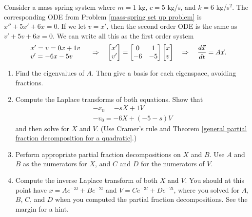 \begin{problem}\label{mass-spring system of first order ODEs solution introduction}
 Consider a mass spring system where $m=1$ kg, $c=5$ kg/s, and  $k=6$ kg/s$^2$.  The corresponding ODE from Problem \ref{mass-spring set up problem} is $x''+5x'+6x=0$. If we let $v=x'$, then the second order ODE is the same as $v'+5v+6x=0$. We can write all this as the first order system
$$
\begin{array}{l}
x'=v=0x+1v\\
v'=-6x-5v 
\end{array}
\quad\Rightarrow\quad
\begin{bmatrix} x'\\v' \end{bmatrix} =\begin{bmatrix} 0&1\\-6&-5 \end{bmatrix}\begin{bmatrix} x\\v \end{bmatrix} 
\quad\Rightarrow\quad
\dfrac{d\vec{x}}{dt} =A\vec x. 
$$
\begin{enumerate}
 \item Find the eigenvalues of $A$.  Then give a basis for each eigenspace, avoiding fractions.
 \item Compute the Laplace transforms of both equations.  
%
Show that
$$
\begin{array}{l}
 -x_0 = -sX+1V\\
 -v_0 = -6X+(-5-s)V
\end{array}
$$
and then solve for $X$ and $V$. (Use Cramer's rule and Theorem \ref{general partial fraction decomposition for a quadratic}.)
\item 
Perform appropriate partial fraction decompositions on $X$ and $B$. Use $A$ and $B$ as the numerators for $X$, and $C$ and $D$ for the numerators of $V$. 
\item 
{}%
Compute the inverse Laplace transform of both $X$ and $V$. You should at this point have $x=Ae^{-3t}+Be^{-2 t}$ and $V=Ce^{-3t}+De^{-2t}$, where you solved for $A$, $B$, $C$, and $D$ when you computed the partial fraction decompositions.  See the margin for a hint.
\end{enumerate}

\end{problem}


















